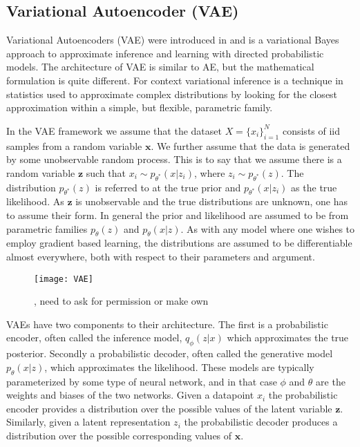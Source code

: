 \documentclass[../../thesis.tex]{subfiles}
\begin{document}
\subsection{Variational Autoencoder (VAE)}
Variational Autoencoders (VAE) were introduced in \cite{kingma2022autoencoding} and is a variational Bayes approach to approximate inference and learning with directed probabilistic models. The architecture of VAE is similar to AE, but the mathematical formulation is quite different. For context variational inference is a technique in statistics used to approximate complex distributions by looking for the closest approximation within a simple, but flexible, parametric family. \newline 

In the VAE framework we assume that the dataset $X = \{x_i\}_{i=1}^{N}$ consists of iid samples from a random variable $\mathbf{x}$. We further assume that the data is generated by some unobservable random process. This is to say that we assume there is a random variable $\mathbf{z}$ such that $x_i \sim p_{\theta^*}(x|z_i)$, where $z_i \sim p_{\theta^*}(z)$. The distribution $p_{\theta^*}(z)$ is referred to at the true prior and $p_{\theta^*}(x|z_i)$ as the true likelihood. As $\mathbf{z}$ is unobservable and the true distributions are unknown, one has to assume their form. In general the prior and likelihood are assumed to be from parametric families $p_{\theta}(z)$ and $p_{\theta}(x|z)$. As with any model where one wishes to employ gradient based learning, the distributions are assumed to be differentiable almost everywhere, both with respect to their parameters and argument.\newline
\begin{figure}[h]
    \texttt{[image: VAE]}
    \centering  
    \caption{\cite{VAE}, need to ask for permission or make own}  
\end{figure}

VAEs have two components to their architecture. The first is a probabilistic encoder, often called the inference model, $q_\phi(z|x)$ which approximates the true posterior. Secondly a probabilistic decoder, often called the generative model $p_\theta(x|z)$, which approximates the likelihood. These models are typically parameterized by some type of neural network, and in that case $\phi$ and $\theta$ are the weights and biases of the two networks. Given a datapoint $x_i$ the probabilistic encoder provides a distribution over the possible values of the latent variable $\mathbf{z}$. Similarly, given a latent representation $z_i$ the probabilistic decoder produces a distribution over the possible corresponding values of $\mathbf{x}$. \newline
\end{document}
